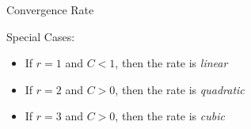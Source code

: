 \documentclass[10pt]{beamer}
\begin{document}
\begin{frame}{Convergence Rate}

{}

\begin{block}{Special Cases:}
\begin{itemize}
  \item If $r=1$ and $C<1$, then the rate is \emph{linear}
  \item If $r=2$ and $C>0$, then the rate is \emph{quadratic}
  \item If $r=3$ and $C>0$, then the rate is \emph{cubic}
\end{itemize}
\end{block}
\end{frame}
\end{document}
